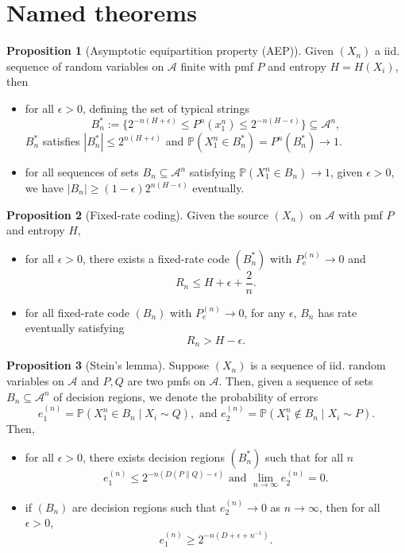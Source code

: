 \documentclass[]{article}
\theoremstyle{definition}
\newtheorem*{proposition}{Proposition}
\begin{document}
\section*{Named theorems}

\begin{proposition}[Asymptotic equipartition property (AEP)]
  Given \((X_n)\) a iid. sequence of random variables on \(\mathscr{A}\) finite with pmf \(P\) and 
  entropy \(H = H(X_i)\), then 
  \begin{itemize}
    \item for all \(\epsilon > 0\), defining the set of typical strings 
    \[B_n^* := \{2^{-n(H + \epsilon)} \le P^n(x_1^n) \le 2^{-n(H - \epsilon)}\} \subseteq \mathscr{A}^n,\]
    \(B_n^*\) satisfies \(|B_n^*| \le 2^{n(H + \epsilon)}\) and \(\mathbb{P}(X_1^n \in B_n^*) = P^n(B_n^*) \to 1\).
    \item for all sequences of sets \(B_n \subseteq \mathscr{A}^n\) satisfying \(\mathbb{P}(X_1^n \in B_n) \to 1\), 
    given \(\epsilon > 0\), we have \(|B_n| \ge (1 - \epsilon)2^{n(H - \epsilon)}\) eventually.
  \end{itemize}
\end{proposition}

\begin{proposition}[Fixed-rate coding]
  Given the source \((X_n)\) on \(\mathscr{A}\) with pmf \(P\) and entropy \(H\), 
  \begin{itemize}
    \item for all \(\epsilon > 0\), there exists a fixed-rate code \((B_n^*)\) with \(P_e^{(n)} \to 0\) 
    and 
    \[R_n \le H + \epsilon + \frac{2}{n}.\]
    \item for all fixed-rate code \((B_n)\) with \(P_e^{(n)} \to 0\), for any \(\epsilon\), \(B_n\) 
    has rate eventually satisfying 
    \[R_n > H - \epsilon.\] 
  \end{itemize}
\end{proposition}

\begin{proposition}[Stein's lemma]
  Suppose \((X_n)\) is a sequence of iid. random variables on \(\mathscr{A}\) and \(P, Q\) are two pmfs 
  on \(\mathscr{A}\). Then, given a sequence of sets \(B_n \subseteq \mathscr{A}^n\) of decision regions, 
  we denote the probability of errors  
  \[e_1^{(n)} = \mathbb{P}(X_1^n \in B_n \mid X_i \sim Q), \text{ and } 
    e_2^{(n)} = \mathbb{P}(X_1^n \not\in B_n \mid X_i \sim P).\]
  Then,
  \begin{itemize}
    \item for all \(\epsilon > 0\), there exists decision regions \((B_n^*)\) such that for all \(n\)
      \[e^{(n)}_1 \le 2^{-n(D(P \| Q) -\epsilon)} \text{ and } \lim_{n \to \infty} e_2^{(n)} = 0.\]
    \item if \((B_n)\) are decision regions such that \(e_2^{(n)} \to 0\) as \(n \to \infty\), then 
      for all \(\epsilon > 0\), 
      \[e_1^{(n)} \ge 2^{-n(D + \epsilon + n^{-1})}.\] 
  \end{itemize}
\end{proposition}
\end{document}
